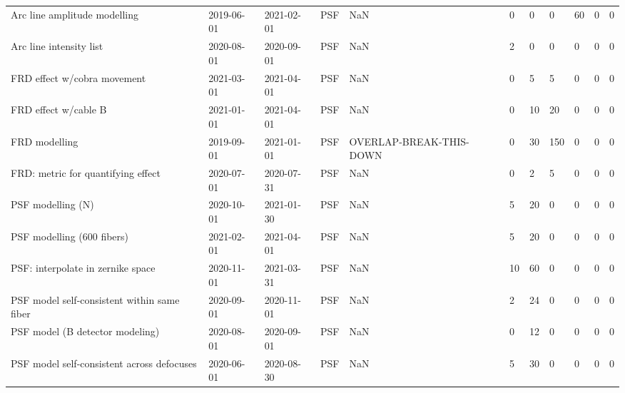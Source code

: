 \begin{longtable}{llllp{2cm}llllll}
                Arc line amplitude modelling &  2019-06-01 &  2021-02-01 &            PSF &                      NaN &      0 &       0 &        0 &      60 &     0 &          0 \\
                     Arc line intensity list &  2020-08-01 &  2020-09-01 &            PSF &                      NaN &      2 &       0 &        0 &       0 &     0 &          0 \\
                 FRD effect w/cobra movement &  2021-03-01 &  2021-04-01 &            PSF &                      NaN &      0 &       5 &        5 &       0 &     0 &          0 \\
                        FRD effect w/cable B &  2021-01-01 &  2021-04-01 &            PSF &                      NaN &      0 &      10 &       20 &       0 &     0 &          0 \\
                               FRD modelling &  2019-09-01 &  2021-01-01 &            PSF &  OVERLAP-BREAK-THIS-DOWN &      0 &      30 &      150 &       0 &     0 &          0 \\
          FRD: metric for quantifying effect &  2020-07-01 &  2020-07-31 &            PSF &                      NaN &      0 &       2 &        5 &       0 &     0 &          0 \\
                           PSF modelling (N) &  2020-10-01 &  2021-01-30 &            PSF &                      NaN &      5 &      20 &        0 &       0 &     0 &          0 \\
                  PSF modelling (600 fibers) &  2021-02-01 &  2021-04-01 &            PSF &                      NaN &      5 &      20 &        0 &       0 &     0 &          0 \\
           PSF: interpolate in zernike space &  2020-11-01 &  2021-03-31 &            PSF &                      NaN &     10 &      60 &        0 &       0 &     0 &          0 \\
 PSF model self-consistent within same fiber &  2020-09-01 &  2020-11-01 &            PSF &                      NaN &      2 &      24 &        0 &       0 &     0 &          0 \\
             PSF model (B detector modeling) &  2020-08-01 &  2020-09-01 &            PSF &                      NaN &      0 &      12 &        0 &       0 &     0 &          0 \\
  PSF model self-consistent across defocuses &  2020-06-01 &  2020-08-30 &            PSF &                      NaN &      5 &      30 &        0 &       0 &     0 &          0 \\
\end{longtable}
